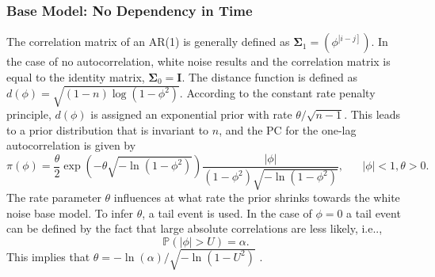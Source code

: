 \subsubsection*{Base Model: No Dependency in Time} 
The correlation matrix of an AR(1) is generally defined as $\pmb{\Sigma}_1=\left(\phi^{\left|i-j\right]}\right)$. In the case of no autocorrelation, white noise results and the correlation matrix is equal to the identity matrix, $\pmb{\Sigma}_0=\pmb{I}$. The distance function is defined as $d\left(\phi\right)=\sqrt{\left(1-n\right)\log\left(1-\phi^2\right)}$. According to the constant rate penalty principle, $d\left(\phi\right)$ is assigned an exponential prior with rate $\theta/\sqrt{n-1}$. This leads to a prior distribution that is invariant to $n$, and the PC for the one-lag autocorrelation is given by
\begin{equation}
    \pi\left(\phi\right)=\frac{\theta}{2}\exp\left(-\theta\sqrt{-\ln\left(1-\phi^2\right)}\right)\frac{|\phi|}{\left(1-\phi^2\right)\sqrt{-\ln\left(1-\phi^2\right)}}, \hspace{20pt} |\phi|<1,\theta>0.
\end{equation}
The rate parameter $\theta$ influences at what rate the prior shrinks towards the white noise base model. To infer $\theta$, a tail event is used. In the case of $\phi = 0$ a tail event can be defined by the fact that large absolute correlations are less likely, i.e..,
\begin{equation*}
    \mathbb{P}\left(|\phi|>U\right) = \alpha.
\end{equation*}
This implies that $\theta=-\ln\left(\alpha\right)/\sqrt{-\ln\left(1-U^2\right)}$ \autocite[][]{sorbye2017penalised}.
